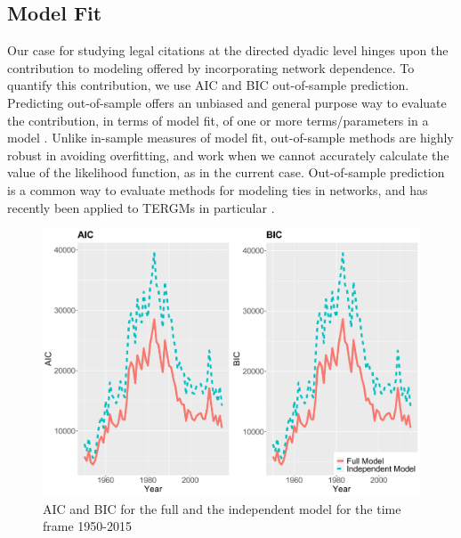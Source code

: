 \documentclass[headsepline=true, abstracton]{scrartcl}
\begin{document}



  
  
\subsection{Model Fit}

Our case for studying legal citations at the directed dyadic level hinges upon the contribution to modeling offered by incorporating network dependence. To quantify this contribution, we use AIC and BIC out-of-sample prediction. Predicting out-of-sample offers an unbiased and general purpose way to evaluate the contribution, in terms of model fit, of one or more terms/parameters in a model \citep{jensen2000multiple,ward2010perils}. Unlike in-sample measures of model fit, out-of-sample methods are highly robust in avoiding overfitting, and work when we cannot accurately calculate the value of the likelihood function, as in the current case. Out-of-sample prediction is a common way to evaluate methods for modeling ties in networks, and has recently been applied to TERGMs in particular \citep{desmarais2013forecasting,cranmer2017can}.

  \begin{figure}[t]
\includegraphics[width=15cm]{SCC_AIC_BIC}
\caption{AIC and BIC for the full and the independent model for the time frame 1950-2015 }
 \label{AIC_BIC}
\vspace{-.25cm}
\end{figure}  
\end{document}
